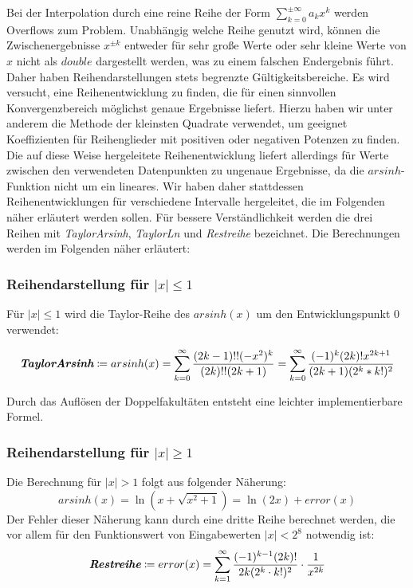 \documentclass[course=erap] {aspdoc}
\begin{document}
    Bei der Interpolation durch eine reine Reihe der Form $\sum_{k=0}^{\pm\infty} a_k x^k$ werden Overflows zum Problem.
    Unabhängig welche Reihe genutzt wird, können die Zwischenergebnisse $x^{\pm k}$ entweder für sehr große Werte oder sehr kleine Werte von $x$ nicht als $double$ dargestellt werden, was zu einem falschen Endergebnis führt.
    Daher haben Reihendarstellungen stets begrenzte Gültigkeitsbereiche.
    Es wird versucht, eine Reihenentwicklung zu finden, die für einen sinnvollen Konvergenzbereich möglichst genaue Ergebnisse liefert.
    Hierzu haben wir unter anderem die Methode der kleinsten Quadrate verwendet, um geeignet Koeffizienten für Reihenglieder mit positiven oder negativen Potenzen zu finden.
    Die auf diese Weise hergeleitete Reihenentwicklung liefert allerdings für Werte zwischen den verwendeten Datenpunkten zu ungenaue Ergebnisse, da die $arsinh$-Funktion nicht um ein lineares.
    Wir haben daher stattdessen Reihenentwicklungen für verschiedene Intervalle hergeleitet, die im Folgenden näher erläutert werden sollen.
    Für bessere Verständlichkeit werden die drei Reihen mit \textit{TaylorArsinh}, \textit{TaylorLn} und \textit{Restreihe} bezeichnet.
    Die Berechnungen werden im Folgenden näher erläutert:

    \subsubsection{Reihendarstellung für $|x|\leq 1$}
    Für $|x| \leq 1$ wird die Taylor-Reihe des $arsinh(x)$ um den Entwicklungspunkt 0 verwendet:

    \[
        \textit{\textbf{TaylorArsinh}}\coloneqq arsinh(x) = \sum_{k = 0}^{\infty} \frac{(2k-1)!!(-x^2)^k}{(2k)!!(2k + 1)}
        = \sum_{k = 0}^{\infty} \frac{(-1)^k(2k)!x^{2k + 1}}{(2k + 1)(2^k*k!)^2}
    \]

    Durch das Auflösen der Doppelfakultäten entsteht eine leichter implementierbare Formel.

    \subsubsection{Reihendarstellung für $|x|\geq 1$}
    Die Berechnung für $|x| > 1$ folgt aus folgender Näherung:
    \[
        arsinh(x) = \ln(x + \sqrt{x^2 + 1}) = \ln(2x) + error(x)
    \]
    Der Fehler dieser Näherung kann durch eine dritte Reihe berechnet werden, die vor allem für den Funktionswert von Eingabewerten $|x| < 2^{8}$ notwendig ist:
    \[
        \textit{\textbf{Restreihe}}\coloneqq error(x) =  \sum_{k = 1}^{\infty} \frac{(-1)^{k - 1}(2k)!}{2k(2^k\cdot k!)^2} \cdot \frac{1}{x^{2k}}
    \]
\end{document}
